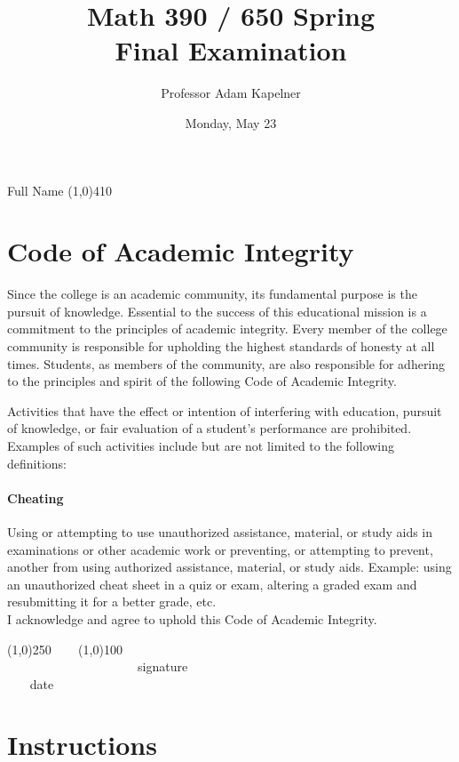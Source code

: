 \documentclass[12pt]{article}
\title{Math 390 / 650 Spring \the\year \\ Final Examination}
\author{Professor Adam Kapelner}
\date{Monday, May 23}
\begin{document}
\maketitle

\noindent Full Name \line(1,0){410}

\thispagestyle{empty}

\section*{Code of Academic Integrity}

\footnotesize
Since the college is an academic community, its fundamental purpose is the pursuit of knowledge. Essential to the success of this educational mission is a commitment to the principles of academic integrity. Every member of the college community is responsible for upholding the highest standards of honesty at all times. Students, as members of the community, are also responsible for adhering to the principles and spirit of the following Code of Academic Integrity.

Activities that have the effect or intention of interfering with education, pursuit of knowledge, or fair evaluation of a student's performance are prohibited. Examples of such activities include but are not limited to the following definitions:

\paragraph{Cheating} Using or attempting to use unauthorized assistance, material, or study aids in examinations or other academic work or preventing, or attempting to prevent, another from using authorized assistance, material, or study aids. Example: using an unauthorized cheat sheet in a quiz or exam, altering a graded exam and resubmitting it for a better grade, etc.
\\

\noindent I acknowledge and agree to uphold this Code of Academic Integrity. \\

\begin{center}
\line(1,0){250} ~~~ \line(1,0){100}\\
~~~~~~~~~~~~~~~~~~~~~signature~~~~~~~~~~~~~~~~~~~~~~~~~~~~~~~~~~~~~~~~~~~~~ date
\end{center}

\normalsize

\section*{Instructions}
\end{document}
